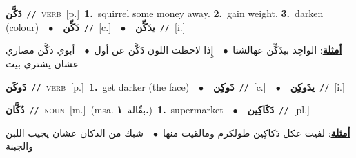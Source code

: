 \documentclass[10pt,a4paper,twoside]{article} %
\begin{document}
\begin{multicols}{2}
{\setlength\topsep{0pt}\textbf{\foreignlanguage{arabic}{دَكَّن}}\ {\color{gray}\texttt{//}\color{black}}\ \textsc{verb}\ [p.]\ \textbf{1.}~squirrel some money away.  \textbf{2.}~gain weight.  \textbf{3.}~darken (colour)\ \ $\bullet$\ \ \setlength\topsep{0pt}\textbf{\foreignlanguage{arabic}{دَكِّن}}\ {\color{gray}\texttt{//}\color{black}}\ [c.]\ \ $\bullet$\ \ \setlength\topsep{0pt}\textbf{\foreignlanguage{arabic}{يدَكِّن}}\ {\color{gray}\texttt{//}\color{black}}\ [i.]\  \begin{flushright}\color{gray}\foreignlanguage{arabic}{\textbf{\underline{\foreignlanguage{arabic}{أمثلة}}}: الواحِد بيدَكِّن عهالشتا\ $\bullet$\ \  إِذا لاحظت اللون دَكَّن عن أول\ $\bullet$\ \  أبوي دكَّن مصاري عشان يشتري بيت}\end{flushright}\color{black}} \vspace{2mm}

{\setlength\topsep{0pt}\textbf{\foreignlanguage{arabic}{دَوكَن}}\ {\color{gray}\texttt{//}\color{black}}\ \textsc{verb}\ [p.]\ \textbf{1.}~get darker (the face)\ \ $\bullet$\ \ \setlength\topsep{0pt}\textbf{\foreignlanguage{arabic}{دَوكِن}}\ {\color{gray}\texttt{//}\color{black}}\ [c.]\ \ $\bullet$\ \ \setlength\topsep{0pt}\textbf{\foreignlanguage{arabic}{يدَوكِن}}\ {\color{gray}\texttt{//}\color{black}}\ [i.]\ } \vspace{2mm}

{\setlength\topsep{0pt}\textbf{\foreignlanguage{arabic}{دُكَّان}}\ {\color{gray}\texttt{//}\color{black}}\ \textsc{noun}\ [m.]\ \color{gray}(msa. \foreignlanguage{arabic}{بقّالة}~\foreignlanguage{arabic}{\textbf{١.}})\color{black}\ \textbf{1.}~supermarket\ \ $\bullet$\ \ \setlength\topsep{0pt}\textbf{\foreignlanguage{arabic}{دَكَاكِين}}\ {\color{gray}\texttt{//}\color{black}}\ [pl.]\  \begin{flushright}\color{gray}\foreignlanguage{arabic}{\textbf{\underline{\foreignlanguage{arabic}{أمثلة}}}: لفيت عكل دَكاكِين طولكرم ومالقيت منها\ $\bullet$\ \  شبك من الدكان عشان يجيب اللبن والجبنة}\end{flushright}\color{black}} \vspace{2mm}


\end{multicols}
\end{document}
